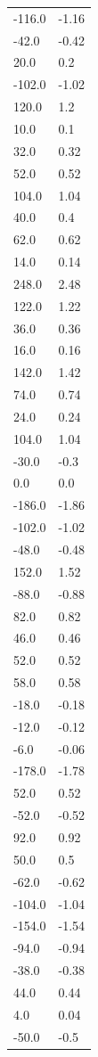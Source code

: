 \begin{longtable}{ll}
-116.0 & -1.16 \\
-42.0 & -0.42 \\
20.0 & 0.2 \\
-102.0 & -1.02 \\
120.0 & 1.2 \\
10.0 & 0.1 \\
32.0 & 0.32 \\
52.0 & 0.52 \\
104.0 & 1.04 \\
40.0 & 0.4 \\
62.0 & 0.62 \\
14.0 & 0.14 \\
248.0 & 2.48 \\
122.0 & 1.22 \\
36.0 & 0.36 \\
16.0 & 0.16 \\
142.0 & 1.42 \\
74.0 & 0.74 \\
24.0 & 0.24 \\
104.0 & 1.04 \\
-30.0 & -0.3 \\
0.0 & 0.0 \\
-186.0 & -1.86 \\
-102.0 & -1.02 \\
-48.0 & -0.48 \\
152.0 & 1.52 \\
-88.0 & -0.88 \\
82.0 & 0.82 \\
46.0 & 0.46 \\
52.0 & 0.52 \\
58.0 & 0.58 \\
-18.0 & -0.18 \\
-12.0 & -0.12 \\
-6.0 & -0.06 \\
-178.0 & -1.78 \\
52.0 & 0.52 \\
-52.0 & -0.52 \\
92.0 & 0.92 \\
50.0 & 0.5 \\
-62.0 & -0.62 \\
-104.0 & -1.04 \\
-154.0 & -1.54 \\
-94.0 & -0.94 \\
-38.0 & -0.38 \\
44.0 & 0.44 \\
4.0 & 0.04 \\
-50.0 & -0.5 \\

\end{longtable}
